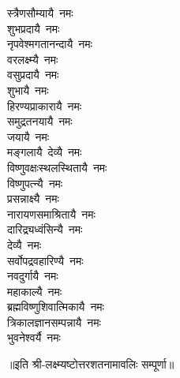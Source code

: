 \begin{multicols}{2}
\begin{flushleft}
स्त्रैणसौम्यायै~नमः\\
शुभप्रदायै~नमः\\
नृपवेश्मगतानन्दायै~नमः\\
वरलक्ष्म्यै~नमः\hfill{}\\
वसुप्रदायै~नमः\\
शुभायै~नमः\\
हिरण्यप्राकारायै~नमः\\
समुद्रतनयायै~नमः\\
जयायै~नमः\\
मङ्गलायै~देव्यै~नमः\\
विष्णुवक्षःस्थलस्थितायै~नमः\\
विष्णुपत्न्यै~नमः\\
प्रसन्नाक्ष्यै~नमः\\
नारायणसमाश्रितायै~नमः\hfill{}\\
दारिद्र्यध्वंसिन्यै~नमः\\
देव्यै~नमः\\
सर्वोपद्रवहारिण्यै~नमः\\
नवदुर्गायै~नमः\\
महाकाल्यै~नमः\\
ब्रह्मविष्णुशिवात्मिकायै~नमः\\
त्रिकालज्ञानसम्पन्नायै~नमः\\
भुवनेश्वर्यै~नमः\hfill{}\\
\end{flushleft}
\end{multicols}
॥इति श्री-लक्ष्म्यष्टोत्तरशतनामावलिः सम्पूर्णा॥